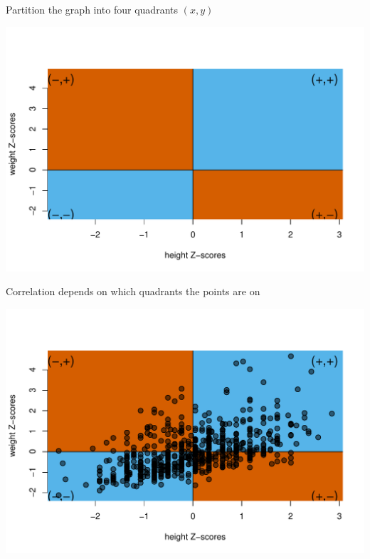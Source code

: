 \documentclass[10pt]{beamer}\usepackage[]{graphicx}\usepackage[]{color}
\makeatletter
\def\maxwidth{ %
  \ifdim\Gin@nat@width>\linewidth
    \linewidth
  \else
    \Gin@nat@width
  \fi
}
\newenvironment{knitrout}{}{} %
\makeatother
\begin{document}
\begin{frame}[fragile]{Partition the graph into four quadrants $(x,y)$}
	
\begin{knitrout}\tiny
{}\color{fgcolor}

{\centering \includegraphics[width=\maxwidth]{figure/unnamed-chunk-3-1} 

}


\end{knitrout}
	
\end{frame}


\begin{frame}[fragile]{Correlation depends on which quadrants the points are on}
	
\begin{knitrout}\tiny
{}\color{fgcolor}

{\centering \includegraphics[width=\maxwidth]{figure/unnamed-chunk-4-1} 

}


\end{knitrout}
	
\end{frame}
\end{document}

